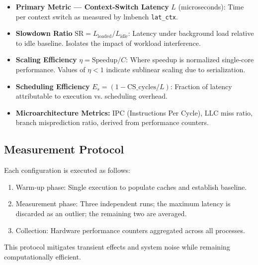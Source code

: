 \documentclass[conference]{IEEEtran}
\begin{document}
\begin{itemize}
  \item \textbf{Primary Metric --- Context-Switch Latency} $L$ (microseconds):
        Time per context switch as measured by lmbench \texttt{lat\_ctx}.
  
  \item \textbf{Slowdown Ratio} $\text{SR} = L_{\text{loaded}} / L_{\text{idle}}$:
        Latency under background load relative to idle baseline. Isolates the
        impact of workload interference.
  
  \item \textbf{Scaling Efficiency} $\eta = \text{Speedup} / C$:
        Where speedup is normalized single-core performance. Values of
        $\eta < 1$ indicate sublinear scaling due to serialization.
  
  \item \textbf{Scheduling Efficiency} $E_s = (1 - \text{CS\_cycles} / L)$:
        Fraction of latency attributable to execution vs. scheduling overhead.
  
  \item \textbf{Microarchitecture Metrics:}
        IPC (Instructions Per Cycle), LLC miss ratio, branch misprediction
        ratio, derived from performance counters.
\end{itemize}

\subsection{Measurement Protocol}

Each configuration is executed as follows:
\begin{enumerate}
  \item Warm-up phase: Single execution to populate caches and establish
        baseline.
  \item Measurement phase: Three independent runs; the maximum latency is
        discarded as an outlier; the remaining two are averaged.
  \item Collection: Hardware performance counters aggregated across all
        processes.
\end{enumerate}

This protocol mitigates transient effects and system noise while remaining
computationally efficient.

\end{document}
